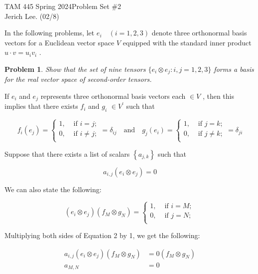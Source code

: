\documentclass[12pt]{article}
\newtheorem{problem}{Problem}
\begin{document}
\noindent TAM 445 Spring 2024\hfill Problem Set \#2\\
Jerich Lee. (02/8)

\hrulefill


\noindent In the following problems, let \(e_i \quad(i=1, 2, 3)\) denote three orthonormal basis vectors for a Euclidean vector space \(V\) equipped with the standard inner product \(u \cdot v = u_i v_i\) .

\begin{problem}
    Show that the set of nine tensors \(\{e_i \otimes e_j: i,j=1,2,3\}\) forms a basis for the real vector space of second-order tensors.
\end{problem}

If \(e_i\) and \(e_j\) represents three orthonormal basis vectors each \(\in V\) , then this implies that there exists \(f_i\) and \(g_i\) \(\in V^{\prime} \) such that

\[
    f_i(e_j) = \begin{cases}
        1,  &\text{ if } i=j ;\\
        0, &\text{ if } i \neq j ;\\
    \end{cases} = \delta_{ij} 
    \quad \text{and} \quad
    g_j(e_i) = \begin{cases}
        1,  &\text{ if } j=k ;\\
        0, &\text{ if } j \neq k ;\\
    \end{cases} = \delta_{ji} 
\]

Suppose that there exists a list of scalars \(\left\{ a_{j,k} \right\} \) such that

\[
    a_{i,j}(e_{i} \otimes e_j)=0 \tag{1} 
\]

We can also state the following:

\[
    (e_i \otimes e_j)(f_M \otimes g_N)= \begin{cases}
        1,  &\text{ if } i=M ;\\
        0, &\text{ if } j = N ;\\
    \end{cases} \tag{2}
\]

Multiplying both sides of Equation 2 by 1, we get the following:

\begin{align*}
    a_{i,j}(e_{i} \otimes e_j)(f_M \otimes g_N)&=0(f_M \otimes g_N) \\
    a_{M,N} &= 0
\end{align*}
\end{document}
